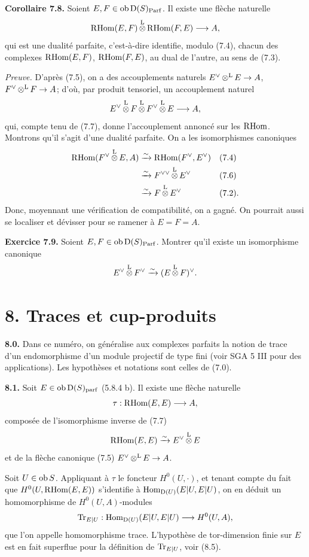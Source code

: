 \documentclass[11pt]{article}
\newcommand{\Parf}{\operatorname{Parf}}
\begin{document}
\textbf{Corollaire 7.8.} Soient \(E,F\in\Ob\Dpx(S)_{\Parf}\). Il existe une flèche naturelle
\[
  \mathrm R\!\operatorname{Hom}(E,F)\mathop{\otimes}^{\mathrm L}\mathrm R\!\operatorname{Hom}(F,E)\longrightarrow A,
\]
qui est une dualité parfaite, c'est-à-dire identifie, modulo (7.4), chacun des complexes \(\mathrm R\!\operatorname{Hom}(E,F)\), \(\mathrm R\!\operatorname{Hom}(F,E)\), au dual de l'autre, au sens de (7.3).

\emph{Preuve.} D'après (7.5), on a des accouplements naturels \(E^\vee\mathop{\otimes}^{\mathrm L} E\to A\), \(F^\vee\mathop{\otimes}^{\mathrm L} F\to A\); d'où, par produit tensoriel, un accouplement naturel
\[
  E^\vee\mathop{\otimes}^{\mathrm L} F\mathop{\otimes}^{\mathrm L} F^\vee\mathop{\otimes}^{\mathrm L} E\longrightarrow A,
\]
qui, compte tenu de (7.7), donne l'accouplement annoncé sur les \(\mathrm R\!\operatorname{Hom}\). Montrons qu'il s'agit d'une dualité parfaite. On a les isomorphismes canoniques
\[
\begin{aligned}
\mathrm R\!\operatorname{Hom}(F^\vee\mathop{\otimes}^{\mathrm L} E,A)&\xrightarrow{\sim}\mathrm R\!\operatorname{Hom}(F^\vee,E^\vee) &&(7.4)\\
&\xrightarrow{\sim}F^{\vee\vee}\mathop{\otimes}^{\mathrm L} E^\vee &&(7.6)\\
&\xrightarrow{\sim}F\mathop{\otimes}^{\mathrm L} E^\vee &&(7.2).
\end{aligned}
\]
Donc, moyennant une vérification de compatibilité, on a gagné. On pourrait aussi se localiser et dévisser pour se ramener à \(E=F=A\).


\textbf{Exercice 7.9.} Soient \(E,F\in\Ob\Dpx(S)_{\Parf}\). Montrer qu'il existe un isomorphisme canonique
\[
  E^\vee\mathop{\otimes}^{\mathrm L} F^\vee \xrightarrow{\sim} (E\mathop{\otimes}^{\mathrm L} F)^\vee .
\]

\section*{8. Traces et cup-produits}

\textbf{8.0.} Dans ce numéro, on généralise aux complexes parfaits la notion de trace d'un endomorphisme d'un module projectif de type fini (voir SGA 5 III pour des applications). Les hypothèses et notations sont celles de (7.0).

\textbf{8.1.} Soit \(E\in\operatorname{ob}\mathrm D(S)_{\operatorname{parf}}\) (5.8.4 b). Il existe une flèche naturelle
\[
  \tau:\mathrm R\!\operatorname{Hom}(E,E)\longrightarrow A,
\]
composée de l'isomorphisme inverse de (7.7)
\[
  \mathrm R\!\operatorname{Hom}(E,E)\xrightarrow{\sim}E^\vee\mathop{\otimes}^{\mathrm L} E
\]
et de la flèche canonique (7.5) \(E^\vee\mathop{\otimes}^{\mathrm L} E\to A\).

Soit \(U\in\operatorname{ob} S\). Appliquant à \(\tau\) le foncteur \(H^0(U,\cdot)\), et tenant compte du fait que \(H^0(U,\mathrm R\!\operatorname{Hom}(E,E))\) s'identifie à \(\operatorname{Hom}_{\mathrm D(U)}(E|U,E|U)\), on en déduit un homomorphisme de \(H^0(U,A)\)-modules
\[
  \operatorname{Tr}_{E|U}:\operatorname{Hom}_{\mathrm D(U)}(E|U,E|U)\longrightarrow H^0(U,A),
\]
que l'on appelle homomorphisme trace. L'hypothèse de tor-dimension finie sur \(E\) est en fait superflue pour la définition de \(\operatorname{Tr}_{E|U}\), voir (8.5).
\end{document}
